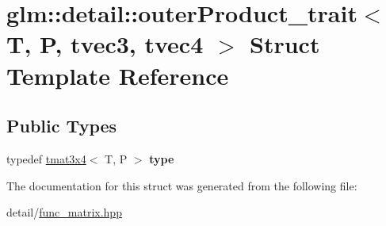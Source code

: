 \hypertarget{structglm_1_1detail_1_1outerProduct__trait_3_01T_00_01P_00_01tvec3_00_01tvec4_01_4}{\section{glm\-:\-:detail\-:\-:outer\-Product\-\_\-trait$<$ T, P, tvec3, tvec4 $>$ Struct Template Reference}
\label{structglm_1_1detail_1_1outerProduct__trait_3_01T_00_01P_00_01tvec3_00_01tvec4_01_4}
}
\subsection*{Public Types}
\begin{DoxyCompactItemize}
\item 
\hypertarget{structglm_1_1detail_1_1outerProduct__trait_3_01T_00_01P_00_01tvec3_00_01tvec4_01_4_a14958bc1241fffaf223abab70496c56d}{typedef \hyperlink{structglm_1_1tmat3x4}{tmat3x4}$<$ T, P $>$ {\bfseries type}}\label{structglm_1_1detail_1_1outerProduct__trait_3_01T_00_01P_00_01tvec3_00_01tvec4_01_4_a14958bc1241fffaf223abab70496c56d}

\end{DoxyCompactItemize}


The documentation for this struct was generated from the following file\-:\begin{DoxyCompactItemize}
\item 
detail/\hyperlink{func__matrix_8hpp}{func\-\_\-matrix.\-hpp}\end{DoxyCompactItemize}
